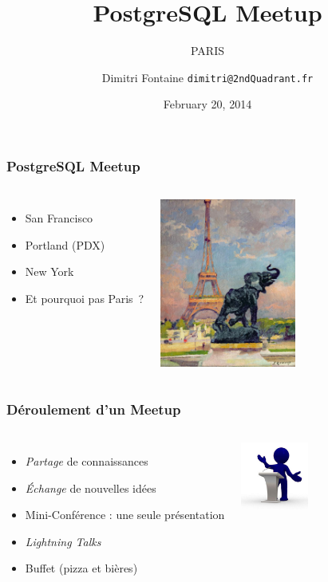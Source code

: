 \documentclass{beamer}
\title{PostgreSQL Meetup}
\subtitle{PARIS}
\author{Dimitri Fontaine \texttt{dimitri@2ndQuadrant.fr}}
\date{February 20, 2014}
\begin{document}
\frame{\titlepage}

\begin{frame}[fragile]
  \frametitle{PostgreSQL Meetup}

  \vfill

\begin{columns}

  \begin{itemize}
  \item San Francisco
  \item Portland (PDX)
  \item New York
  \item Et pourquoi pas Paris ?
  \end{itemize}

\begin{center}
  \includegraphics[height=15em]{the-eiffel-tower-and-the-elephant-by-fremiet-jules-ernest-renoux.jpg}
\end{center}
\end{columns}
\end{frame}

\begin{frame}[fragile]
  \frametitle{Déroulement d'un Meetup}

  \vfill

\begin{columns}

\begin{itemize}
\item \textit{Partage} de connaissances
\item \textit{Échange} de nouvelles idées
\item Mini-Conférence : une seule présentation
\item \textit{Lightning Talks}
\item Buffet (pizza et bières)
\end{itemize}

\begin{center}
  \includegraphics[height=6em]{conferences.jpg}
\end{center}
\end{columns}
\end{frame}
\end{document}
